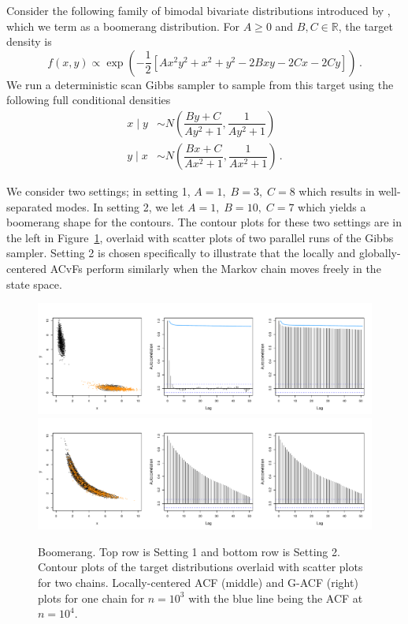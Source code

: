 \documentclass[12pt]{article}
\theoremstyle{remark}
\begin{document}
Consider the following family of bimodal bivariate distributions introduced by \cite{gelman1991note}, which we term as a boomerang distribution. For $A \geq 0$ and $B, C  \in \mathbb{R}$, the target density is
%
\[
f(x, y) \propto \exp\left(-\dfrac{1}{2} \left[Ax^2y^2 + x^2 + y^2 -2Bxy  -2Cx - 2Cy  \right]\right)\,.
\]
We run a deterministic scan Gibbs sampler to sample from this target using the following full conditional densities
%
\begin{align*}
    x \mid y &\sim N\left(\dfrac{By + C}{Ay^2 + 1}, \dfrac{1}{Ay^2 + 1}\right)\\
    y \mid x &\sim N\left(\dfrac{Bx + C}{Ax^2 + 1}, \dfrac{1}{Ax^2 + 1}\right)\,.
\end{align*}


We consider two settings; in setting 1,
$A = 1,\; B = 3,\; C = 8$ which results in well-separated modes. In setting 2, we let $A = 1, \; B = 10, \; C=7$ which yields a boomerang shape for the contours. The contour plots for these two settings are in the left in Figure~\ref{fig:boom-2D}, overlaid with scatter plots of two parallel runs of the Gibbs sampler. Setting 2 is chosen specifically to illustrate that the locally and globally-centered ACvFs perform similarly when the Markov chain moves freely in the state space. 

\begin{figure}[htbp]
    \centering
    \includegraphics[width = .70\textwidth]{plots/boom-all_1_3_8.pdf}\\
    \includegraphics[width = .70\textwidth]{plots/boom-all_1_10_7.pdf}    
    \caption{Boomerang. Top row is Setting 1 and bottom row is Setting 2. Contour plots of the target distributions  overlaid with scatter plots for two chains.  Locally-centered ACF (middle) and G-ACF (right) plots for one chain for $n = 10^3$ with the blue line being the ACF at $n = 10^4$.  }
   \label{fig:boom-2D}
\end{figure}
\end{document}
